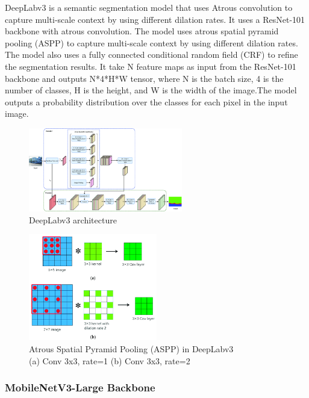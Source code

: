 DeepLabv3 is a semantic segmentation model that uses Atrous convolution to capture multi-scale context by using different dilation rates. It uses a ResNet-101 backbone with atrous convolution. The model uses atrous spatial pyramid pooling (ASPP) to capture multi-scale context by using different dilation rates. The model also uses a fully connected conditional random field (CRF) to refine the segmentation results. 
It take N feature maps as input from the ResNet-101 backbone and outputs N*4*H*W tensor, where N is the batch size, 4 is the number of classes, H is the height, and W is the width of the image.The model outputs a probability distribution over the classes for each pixel in the input image.  
\begin{figure}[ht]
    \centering
    \includegraphics[width=0.6\textwidth]{Images/deeplabv3.png}
    \caption{DeepLabv3 architecture~\cite{deeplabv3-image}}
    \label{fig:deeplabv3}
\end{figure}

\begin{figure}[ht]
    \centering
    \includegraphics[width=0.5\textwidth]{Images/atrous-convolution.png}
    \caption{Atrous Spatial Pyramid Pooling (ASPP) in DeepLabv3\\ (a) Conv 3x3, rate=1 (b) Conv 3x3, rate=2 \\
    \cite{atrous-convolution-image}}
    \label{fig:atrous-convolution}
\end{figure}


\subsubsection{MobileNetV3-Large Backbone}

